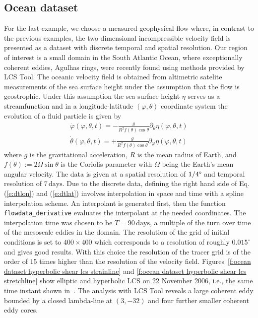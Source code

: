 \documentclass{article}
\begin{document}
\clearpage

\subsection{Ocean dataset}

For the last example, we choose a measured geophysical flow where, in contrast to the previous examples, the two dimensional incompressible velocity field is presented as a dataset with discrete temporal and spatial resolution. Our region of interest is a small domain in the South Atlantic Ocean, where exceptionally coherent eddies, Agulhas rings, were recently found using methods provided by LCS Tool\parencite{haller13:_coher_lagran}. The oceanic velocity field is obtained from altimetric satelite measurements of the sea surface height under the assumption that the flow is geostrophic. Under this assumption the sea surface height $\eta$ serves as a streamfunction and in a longitude-latitude $(\varphi,\theta)$ coordinate system the evolution of a fluid particle is given by
\begin{eqnarray}
\dot{\varphi}(\varphi,\theta,t) = -\frac{g}{R^2 f(\theta) \cos\theta}\partial_{\theta}\eta(\varphi,\theta,t)\label{e:dtlon}\\
\dot{\theta}(\varphi,\theta,t) = +\frac{g}{R^2 f(\theta) \cos\theta}\partial_{\varphi}\eta(\varphi,\theta,t)
\label{e:dtlat}
\end{eqnarray}
where $g$ is the gravitational acceleration, $R$ is the mean radius of Earth, and $f(\theta):=2\Omega\sin\theta$ is the Coriolis parameter with $\Omega$ being the Earth's mean angular velocity. The data is given at a spatial resolution of $1/4\degree$ and temporal resolution of $7\,\mathrm{days}$. Due to the discrete data, defining the right hand side of Eq.\,(\ref{e:dtlon}) and (\ref{e:dtlat}) involves interpolation in space and time with a spline interpolation scheme. An interpolant is generated first, then the function \texttt{flowdata\_derivative} evaluates the interpolant at the needed coordinates. The interpolation time was chosen to be $T=90\,\mathrm{days}$, a multiple of the turn over time of the mesoscale eddies in the domain. The resolution of the grid of initial conditions is set to $400\times400$ which corresponds to a resolution of roughly $0.015^\circ$ and gives good results. With this choice the resolution of the tracer grid is of the order of $15$ times higher than the resolution of the velocity field.
Figures~\ref{f:ocean dataset hyperbolic shear lcs strainline} and \ref{f:ocean dataset hyperbolic shear lcs stretchline} show elliptic and hyperbolic LCS on 22 November 2006, i.e., the same time instant shown in~\textcite{haller13:_coher_lagran,beron-vera13:_objec_agulh}. The analysis with LCS Tool reveals a large coherent eddy bounded by a closed lambda-line at $(3,-32)$ and four further smaller coherent eddy cores. 
\end{document}
